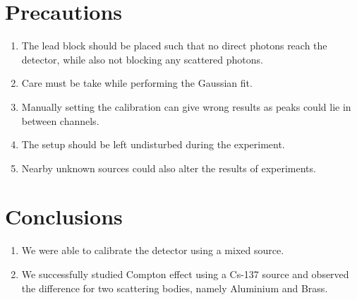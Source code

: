 \documentclass[%
 reprint,
nofootinbib,
 amsmath,amssymb,
 aps,
floatfix,
]{revtex4-2}
\begin{document}
\section{Precautions}
    \begin{enumerate}
        \item The lead block should be placed such that no direct photons reach the detector, while also not blocking any scattered photons.
        \item Care must be take while performing the Gaussian fit.
        \item Manually setting the calibration can give wrong results as peaks could lie in between channels.
        \item The setup should be left undisturbed during the experiment.
        \item Nearby unknown sources could also alter the results of experiments.
    \end{enumerate}
\section{Conclusions}
    \begin{enumerate}
        \item We were able to calibrate the detector using a mixed source.
        \item We successfully studied Compton effect using a Cs-137 source and observed the difference for two scattering bodies, namely Aluminium and Brass.
    \end{enumerate}
\end{document}
